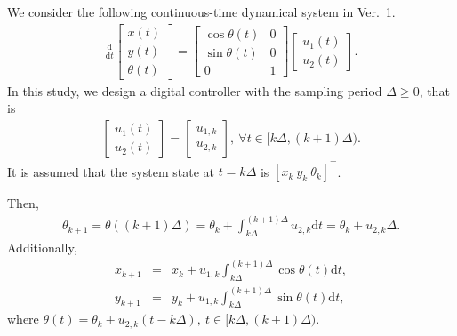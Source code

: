 \documentclass[11pt,a4paper]{jsarticle}
\begin{document}
We consider the following continuous-time dynamical system in Ver.\ 1.
\begin{eqnarray}
\frac{\text{d}}{\text{d}t}\begin{bmatrix}
   x(t)\\
   y(t)\\
   \theta(t)
\end{bmatrix}=\begin{bmatrix}
   \cos\theta(t) & 0 \\
   \sin\theta(t) & 0 \\
   0 & 1
\end{bmatrix}\begin{bmatrix}
   u_1(t)\\
   u_2(t)
\end{bmatrix}.
\end{eqnarray}
In this study, we design a digital controller with the sampling period $\Delta\ge0$, that is
\begin{eqnarray}
\begin{bmatrix}
   u_1(t) \\
   u_2(t)
\end{bmatrix}=\begin{bmatrix}
   u_{1,k} \\
   u_{2,k}
\end{bmatrix},\ \forall t\in[k\Delta,(k+1)\Delta).
\end{eqnarray}
It is assumed that the system state at $t=k\Delta$ is $[x_{k}\ y_{k}\ \theta_{k}]^{\top}$.

Then, 
\begin{eqnarray}
\theta_{k+1}=\theta((k+1)\Delta)=\theta_{k}+\int_{k\Delta}^{(k+1)\Delta}u_{2,k}\text{d}t=\theta_{k}+u_{2,k}\Delta.
\end{eqnarray}
Additionally, 
\begin{eqnarray}
x_{k+1}&=&x_{k}+u_{1,k}\int_{k\Delta}^{(k+1)\Delta}\cos\theta(t)\text{d}t,\\
y_{k+1}&=&y_{k}+u_{1,k}\int_{k\Delta}^{(k+1)\Delta}\sin\theta(t)\text{d}t,
\end{eqnarray}
where $\theta(t)=\theta_{k}+u_{2,k}(t-k\Delta),\ t\in[k\Delta,(k+1)\Delta)$.
\end{document}
